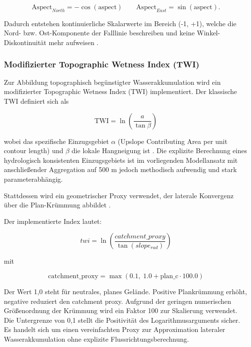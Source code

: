 \documentclass[../main.tex]{subfiles}
\begin{document}
\[
    \mathrm{Aspect}_{North} = -\cos(\mathrm{aspect})
    \qquad
    \mathrm{Aspect}_{East} = \sin(\mathrm{aspect}).
\]



Dadurch entstehen kontinuierliche Skalarwerte im Bereich (-1, +1), welche die Nord- bzw. Ost-Komponente der Falllinie beschreiben und keine Winkel-Diskontinuität mehr aufweisen \autocite{fisherStatisticalAnalysisCircular1993}.



\subsubsection{Modifizierter Topographic Wetness Index (TWI)}


Zur Abbildung topographisch begünstigter Wasserakkumulation wird ein modifizierter Topographic Wetness Index (TWI) implementiert. Der klassische TWI definiert sich als


\[
    \mathrm{TWI} = \ln\!\left(\frac{a}{\tan \beta}\right)
\]


wobei das spezifische Einzugsgebiet $\alpha$ (Upslope Contributing Area per unit contour length) und $\beta$ die lokale Hangneigung ist \autocite{bevenPhysicallyBasedVariable1979a}. Die explizite Berechnung eines hydrologisch konsistenten Einzugsgebiets ist im vorliegenden Modellansatz mit anschließender Aggregation auf 500 m jedoch methodisch aufwendig und stark parameterabhängig.

Stattdessen wird ein geometrischer Proxy verwendet, der laterale Konvergenz über die Plan-Krümmung abbildet \autocite{zevenbergenQuantitativeAnalysisLand1987}.


Der implementierte Index lautet:

\[
    twi = \ln\left(\frac{catchment\_proxy}{\tan(slope_{rad})}\right)
\]

mit

\[
    \mathrm{catchment\_proxy}
    =
    \max\!\left(
    0.1,\;
    1.0 + \mathrm{plan\_c} \cdot 100.0
    \right)
\]

Der Wert 1,0 steht für neutrales, planes Gelände. Positive Plankrümmung erhöht, negative reduziert den catchment proxy. Aufgrund der geringen numerischen Größenordnung der Krümmung wird ein Faktor 100 zur Skalierung verwendet. Die Untergrenze von 0,1 stellt die Positivität des Logarithmusarguments sicher. Es handelt sich um einen vereinfachten Proxy zur Approximation lateraler Wasserakkumulation ohne explizite Flussrichtungsberechnung.
\end{document}
